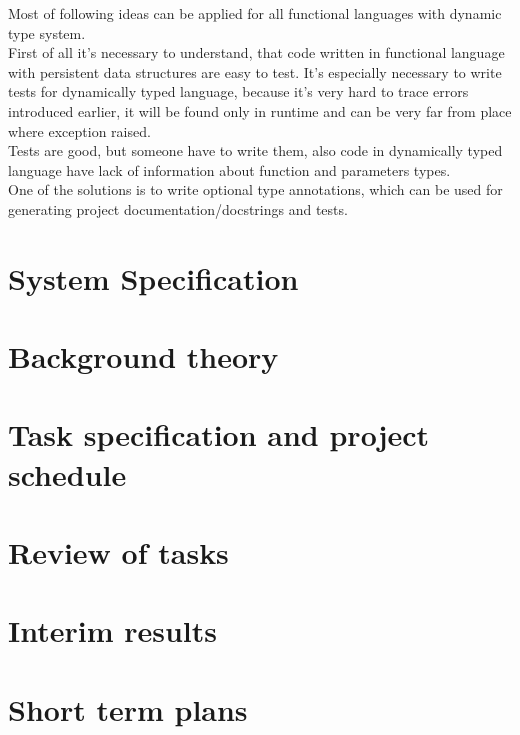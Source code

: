 \documentclass[12pt,a4paper]{report}
\begin{document}
Most of following ideas can be applied for all functional languages with dynamic type system.\\

First of all it's necessary to understand, that code written in functional
language with persistent data structures are easy to test. It's especially
necessary to write tests for dynamically typed language, because it's very
hard to trace errors introduced earlier, it will be found only in runtime
and can be very far from place where exception raised. \\

Tests are good, but someone have to write them, also code in dynamically
typed language have lack of information about function and parameters
types.\\

One of the solutions is to write optional type annotations,
which can be used for generating project documentation/docstrings
and tests.

\section*{System Specification}

\section*{Background theory}
\section*{Task specification and project schedule}
\section*{Review of tasks}
\section*{Interim results}
\section*{Short term plans}
\end{document}
